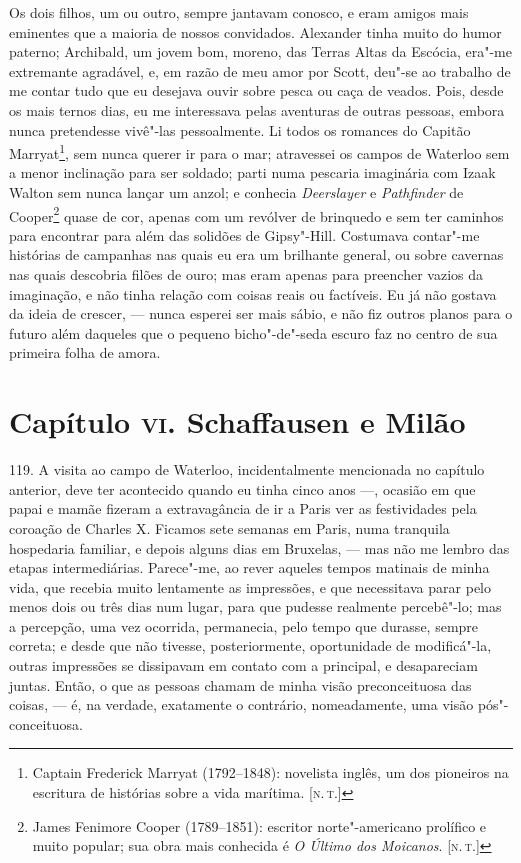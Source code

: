 Os dois filhos, um ou outro, sempre jantavam conosco, e eram amigos mais
eminentes que a maioria de nossos convidados. Alexander tinha muito do
humor paterno; Archibald, um jovem bom, moreno, das Terras Altas da
Escócia, era"-me extremante agradável, e, em razão de meu amor por Scott,
deu"-se ao trabalho de me contar tudo que eu desejava ouvir sobre pesca
ou caça de veados. Pois, desde os mais ternos dias, eu me interessava
pelas aventuras de outras pessoas, embora nunca pretendesse vivê"-las
pessoalmente. Li todos os romances do Capitão Marryat\footnote{Captain
  Frederick Marryat (1792--1848): novelista inglês, um dos pioneiros na
  escritura de histórias sobre a vida marítima. {[}\textsc{n.\,t.}{]}}, sem
nunca querer ir para o mar; atravessei os campos de Waterloo sem a menor
inclinação para ser soldado; parti numa pescaria imaginária com Izaak
Walton sem nunca lançar um anzol; e conhecia \emph{Deerslayer} e
\emph{Pathfinder} de Cooper\footnote{James Fenimore Cooper (1789--1851):
  escritor norte"-americano prolífico e muito popular; sua obra mais
  conhecida é \emph{O Último dos Moicanos}. {[}\textsc{n.\,t.}{]}} quase de
cor, apenas com um revólver de brinquedo e sem ter caminhos para
encontrar para além das solidões de Gipsy"-Hill. Costumava contar"-me
histórias de campanhas nas quais eu era um brilhante general, ou sobre
cavernas nas quais descobria filões de ouro; mas eram apenas para
preencher vazios da imaginação, e não tinha relação com coisas reais ou
factíveis. Eu já não gostava da ideia de crescer, --- nunca esperei ser
mais sábio, e não fiz outros planos para o futuro além daqueles que o
pequeno bicho"-de"-seda escuro faz no centro de sua primeira folha de
amora.

\chapter{Capítulo \textsc{vi}. Schaffausen e Milão}

119. A visita ao campo de Waterloo, incidentalmente mencionada no
capítulo anterior, deve ter acontecido quando eu tinha cinco anos ---,
ocasião em que papai e mamãe fizeram a extravagância de ir a Paris ver
as festividades pela coroação de Charles X. Ficamos sete semanas em
Paris, numa tranquila hospedaria familiar, e depois alguns dias em
Bruxelas, --- mas não me lembro das etapas intermediárias. Parece"-me, ao
rever aqueles tempos matinais de minha vida, que recebia muito
lentamente as impressões, e que necessitava parar pelo menos dois ou
três dias num lugar, para que pudesse realmente percebê"-lo; mas a
percepção, uma vez ocorrida, permanecia, pelo tempo que durasse, sempre
correta; e desde que não tivesse, posteriormente, oportunidade de
modificá"-la, outras impressões se dissipavam em contato com a principal,
e desapareciam juntas. Então, o que as pessoas chamam de minha visão
preconceituosa das coisas, --- é, na verdade, exatamente o contrário,
nomeadamente, uma visão pós"-conceituosa.

